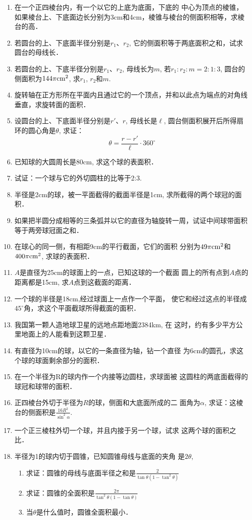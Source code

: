 \begin{enumerate}
\item 在一个正四棱台内，有一个以它的上底为底面，下底的
中心为顶点的棱锥，如果棱台上、下底面边长分别为3cm和4cm，棱锥与棱台的侧面积相等，求棱台的高．
\item 若圆台的上、下底面半径分别是$r_1$、$r_2$, 它的侧面积等于两底面积之和，试求圆台的母线长．
\item 若圆台的上、下底半径分别是$r_1$、$r_2$, 母线长为$m$, 若$r_1:r_2:m=2:1:3$, 圆台的侧面积为$144\pi{\rm cm^2}$, 求$r_1$, $r_2$和$m$.
\item 旋转轴在正方形所在平面内且通过它的一个顶点，并和以此点为端点的对角线垂直，求旋转面的面积．
\item 设圆台的上、下底面半径分别是$r'$、$r$, 母线长是$\ell$, 圆台侧面积展开后所得扇环的圆心角是$\theta$, 求证：
\[\theta=\frac{r-r'}{\ell}\cdot 360^{\circ}\]
\item 已知球的大圆周长是80cm, 求这个球的表面积．
\item 试证：一个球与它的外切圆柱的比等于2:3. 
\item 半径是2cm的球，被一平面截得的截面半径是1cm, 求所截得的两个球冠的面积．
\item 如果把半圆分成相等的三条弧并以它的直径为轴旋转一周，试证中间球带面积等于两旁球冠面之和．
\item 在球心的同一侧，有相距9cm的平行截面，它们的面积
分别为$49\pi {\rm cm^2}$和$400\pi {\rm cm^2}$, 求球的表面积．
\item $A$是直径为25cm的球面上的一点，已知这球的一个截面
圆上的所有点到$A$点的距离都是15cm, 求$A$点到这截面的距离．
\item 一个球的半径是18cm,经过球面上一点作一个平面，
使它和经过这点的半径成$45^{\circ}$角，求这个平面截球所得截面的面积．
\item 我国第一颗人造地球卫星的远地点距地面2384km, 在
这时，约有多少平方公里地面上的人能看到这颗卫星．
\item 有直径为10cm的球，以它的一条直径为轴，钻一个直径
为6cm的圆孔，求这个球的球面剩余部分的面积．
\item 在一个半径为R的球内作一个内接等边圆柱，求球面被
这圆柱的两底面截得的球冠和球带的面积．
\item 正四棱台外切于半径为$R$的球，侧面和大底面所成的二
面角为$\alpha$, 求证：这棱台的侧面积是$\frac{16R^2}{\sin^2\alpha}$.
\item 一个正三棱柱外切一个球，并且内接于另一个球，试求
这两个球的面积之比．
\item 半径为1的球内切于圆锥，已知圆锥母线与底面的夹角
是$2\theta$,
\begin{enumerate}
\item 求证：圆锥的母线与底面半径之和是$\frac{2}{\tan\theta(1-\tan^2\theta)}$
\item 求证：圆锥的全面积是$\frac{2\pi}{\tan^2\theta(1-\tan\theta)}$
\item 当$\theta$是什么值时，圆锥全面积最小．
\end{enumerate}
\end{enumerate}

